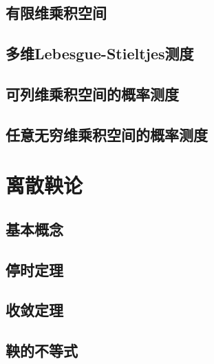 \section{有限维乘积空间}
\section{多维Lebesgue-Stieltjes测度}
\section{可列维乘积空间的概率测度}
\section{任意无穷维乘积空间的概率测度}
\chapter{离散鞅论}
\section{基本概念}
\section{停时定理}
\section{收敛定理}
\section{鞅的不等式}